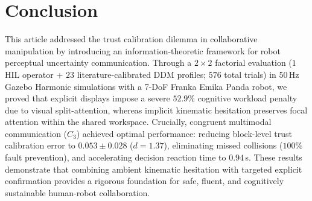 \documentclass[conference]{IEEEtran}
\begin{document}
\section{Conclusion}
This article addressed the trust calibration dilemma in collaborative manipulation by introducing an information-theoretic framework for robot perceptual uncertainty communication. Through a $2 \times 2$ factorial evaluation ($1$ HIL operator + $23$ literature-calibrated DDM profiles; $576$ total trials) in 50\,Hz Gazebo Harmonic simulations with a 7-DoF Franka Emika Panda robot, we proved that explicit displays impose a severe $52.9\%$ cognitive workload penalty due to visual split-attention, whereas implicit kinematic hesitation preserves focal attention within the shared workspace. Crucially, congruent multimodal communication ($C_3$) achieved optimal performance: reducing block-level trust calibration error to $0.053 \pm 0.028$ ($d = 1.37$), eliminating missed collisions ($100\%$ fault prevention), and accelerating decision reaction time to $0.94$\,s. These results demonstrate that combining ambient kinematic hesitation with targeted explicit confirmation provides a rigorous foundation for safe, fluent, and cognitively sustainable human-robot collaboration.
\end{document}
